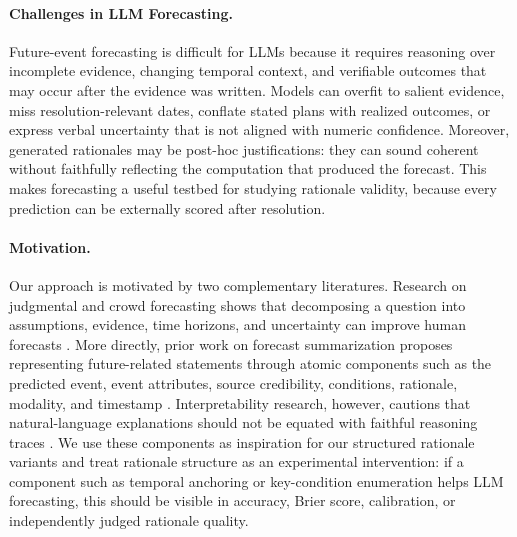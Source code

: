 \documentclass[11pt]{article}
\begin{document}
\paragraph{Challenges in LLM Forecasting.}
Future-event forecasting is difficult for LLMs because it requires reasoning over incomplete evidence, changing temporal context, and verifiable outcomes that may occur after the evidence was written.
Models can overfit to salient evidence, miss resolution-relevant dates, conflate stated plans with realized outcomes, or express verbal uncertainty that is not aligned with numeric confidence.
Moreover, generated rationales may be post-hoc justifications: they can sound coherent without faithfully reflecting the computation that produced the forecast.
This makes forecasting a useful testbed for studying rationale validity, because every prediction can be externally scored after resolution.

\paragraph{Motivation.}
Our approach is motivated by two complementary literatures.
Research on judgmental and crowd forecasting shows that decomposing a question into assumptions, evidence, time horizons, and uncertainty can improve human forecasts \cite{tetlock2015superforecasting}.
More directly, prior work on forecast summarization proposes representing future-related statements through atomic components such as the predicted event, event attributes, source credibility, conditions, rationale, modality, and timestamp \cite{saha2025wisdom}.
Interpretability research, however, cautions that natural-language explanations should not be equated with faithful reasoning traces \cite{jacovi2020towards}.
We use these components as inspiration for our structured rationale variants and treat rationale structure as an experimental intervention: if a component such as temporal anchoring or key-condition enumeration helps LLM forecasting, this should be visible in accuracy, Brier score, calibration, or independently judged rationale quality.
\end{document}
